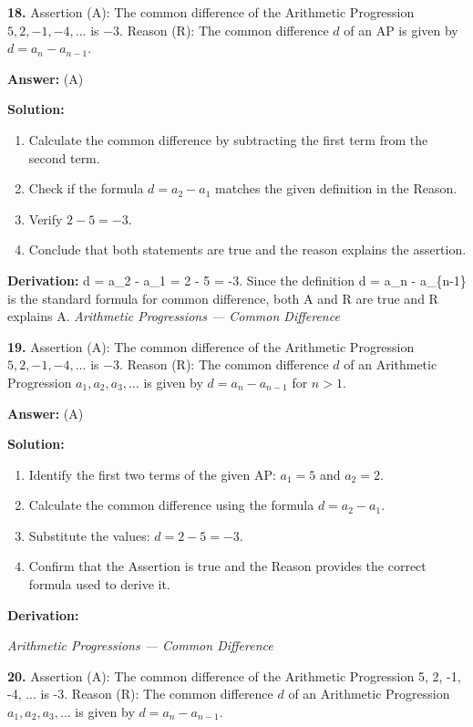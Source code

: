 \documentclass[12pt,a4paper]{exam}
\newcommand{\fitmath}[1]{%
  \sbox{\schmathbox}{$\displaystyle #1$}%
  \ifdim\wd\schmathbox>\linewidth
    \resizebox{\linewidth}{!}{\usebox{\schmathbox}}%
  \else
    \usebox{\schmathbox}%
  \fi}
\begin{document}
\begin{questions}
\question \textbf{18.} Assertion (A): The common difference of the Arithmetic Progression $5, 2, -1, -4, ...$ is $-3$. Reason (R): The common difference $d$ of an AP is given by $d = a_{n} - a_{n-1}$.

\textbf{Answer:}
(A)

\textbf{Solution:}
\begin{enumerate}
  \item Calculate the common difference by subtracting the first term from the second term.
  \item Check if the formula $d = a_2 - a_1$ matches the given definition in the Reason.
  \item Verify $2 - 5 = -3$.
  \item Conclude that both statements are true and the reason explains the assertion.
\end{enumerate}
\textbf{Derivation:}
d = a\_2 - a\_1 = 2 - 5 = -3. Since the definition d = a\_n - a\_\{n-1\} is the standard formula for common difference, both A and R are true and R explains A.
\hfill \textit{Arithmetic Progressions — Common Difference}
\vspace{0.3cm}

\question \textbf{19.} Assertion (A): The common difference of the Arithmetic Progression $5, 2, -1, -4, \dots$ is $-3$. Reason (R): The common difference $d$ of an Arithmetic Progression $a_1, a_2, a_3, \dots$ is given by $d = a_n - a_{n-1}$ for $n > 1$.

\textbf{Answer:}
(A)

\textbf{Solution:}
\begin{enumerate}
  \item Identify the first two terms of the given AP: $a_1 = 5$ and $a_2 = 2$.
  \item Calculate the common difference using the formula $d = a_2 - a_1$.
  \item Substitute the values: $d = 2 - 5 = -3$.
  \item Confirm that the Assertion is true and the Reason provides the correct formula used to derive it.
\end{enumerate}
\textbf{Derivation:}
\begin{center}
\fitmath{d = a_2 - a_1 = 2 - 5 = -3}
\end{center}
\hfill \textit{Arithmetic Progressions — Common Difference}
\vspace{0.3cm}

\question \textbf{20.} Assertion (A): The common difference of the Arithmetic Progression 5, 2, -1, -4, ... is -3. Reason (R): The common difference $d$ of an Arithmetic Progression $a_1, a_2, a_3, ...$ is given by $d = a_{n} - a_{n-1}$.


\end{questions}
\end{document}
